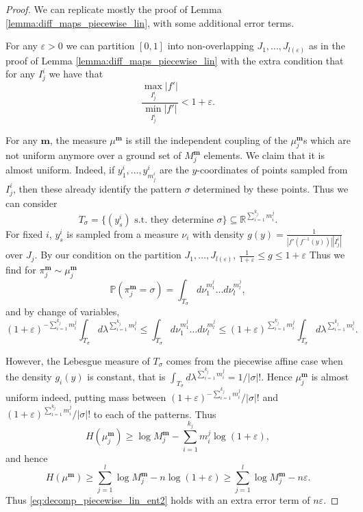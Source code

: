 \documentclass[11pt]{article}
\theoremstyle{definition}
\begin{document}
\begin{proof}
    We can replicate mostly the proof of Lemma \ref{lemma:diff_maps_piecewise_lin}, with some additional error terms.
    
    For any $\varepsilon>0$ we can partition $[0,1]$ into non-overlapping $J_1, ..., J_{l(\varepsilon)}$ as in the proof of Lemma \ref{lemma:diff_maps_piecewise_lin} with the extra condition that for any $I_j^i$ we have that
    $$\frac{\max_{I_j^i} |f'|}{\min_{I_j^i} |f'|}< 1+\varepsilon.$$


    For any $\mathbf{m}$, the measure $\mu^{\mathbf{m}}$ is still the independent coupling of the $\mu_j^{\mathbf{m}}$s which are not uniform anymore over a ground set of $M_j^{\mathbf{m}}$ elements. We claim that it is almost uniform. Indeed, if $y_1^i, \dots, y_{m_j^i}^i$ are the $y$-coordinates of points sampled from $I_j^i$, then these already identify the pattern $\sigma$ determined by these points. Thus we can consider 
    $$T_\sigma = \{(y_s^i) \text{ s.t. they determine } \sigma\}\subseteq \mathbb{R}^{\sum_{i=1}^{k_j}m_i^j}.$$
    For fixed $i$, $y_s^i$ is sampled from a measure $\nu_i$ with density $g(y)=\frac{1}{|f'(f^{-1}(y))| |I_j^i|}$ over $J_j$. By our condition on the partition $J_1, \dots, J_{l(\varepsilon)}$, $\frac{1}{1+\varepsilon}\leq g\leq 1+\varepsilon$
    Thus we find for $\pi_j^{\mathbf{m}}\sim \mu_j^{\mathbf{m}}$
    $$\mathbb{P}(\pi_j^{\mathbf{m}} = \sigma)= \int_{T_\sigma}d\nu_1^{m_1^j}\dots d\nu_l^{m_l^j},$$
    and by change of variables,
    $$(1+\varepsilon)^{-\sum_{i=1}^{k_j}{m_i^j}} \int_{T_\sigma}d\lambda^{\sum_{i=1}^{k_j}{m_i^j}}\leq \int_{T_\sigma}d\nu_1^{m_1^j}\dots d\nu_l^{m_l^j} \leq (1+\varepsilon)^{\sum_{i=1}^{k_j}{m_i^j}} \int_{T_\sigma}d\lambda^{\sum_{i=1}^{k_j}{m_i^j}}.$$
    
    However, the Lebesgue measure of $T_\sigma$ comes from the piecewise affine case when the density $g_i(y)$ is constant, that is $\int_{T_\sigma}d\lambda^{\sum_{i=1}^{k_j}{m_i^j}} = 1/|\sigma|!$. Hence $\mu_j^{\mathbf{m}}$ is almost uniform indeed, putting mass between $(1+\varepsilon)^{-\sum_{i=1}^{k_j}{m_i^j}}/|\sigma|!$ and $(1+\varepsilon)^{\sum_{i=1}^{k_j}{m_i^j}}/|\sigma|!$ to each of the patterns. Thus
    $$H(\mu_j^\mathbf{m})\geq \log M_j^{\mathbf{m}} - \sum_{i=1}^{k_j}{m_i^j} \log(1+\varepsilon),$$
    and hence
    $$H(\mu^{\mathbf{m}})\geq \sum_{j=1}^{l}\log M_j^{\mathbf{m}} - n\log(1+\varepsilon) \geq \sum_{j=1}^{l}\log M_j^{\mathbf{m}}-n\varepsilon.$$
    Thus \eqref{eq:decomp_piecewise_lin_ent2} holds with an extra error term of $n\varepsilon$.


\end{proof}
\end{document}
